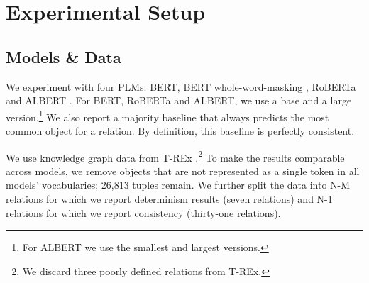 \section{Experimental Setup}
\label{sec:setup}

\subsection{Models \& Data}
\label{setupdata}
We experiment with four PLMs:
BERT, BERT whole-word-masking
\cite{bert}, RoBERTa \cite{roberta} and ALBERT
\cite{albert}. For BERT, RoBERTa and ALBERT, we use a base and a large version.\footnote{For ALBERT we use the smallest and largest versions.}
We also report a majority baseline that always predicts the most common object for a relation. By definition, this baseline is perfectly consistent.




We use knowledge graph data from T-REx \cite{trex}.\footnote{We discard three poorly defined relations from T-REx.} To make the results comparable across models, we remove objects that are not represented as a single token in all models'
vocabularies; 26,813 tuples remain.
We further split the data into N-M relations for which we
report  determinism results (seven relations) and N-1
relations for which we report consistency (thirty-one relations). 


